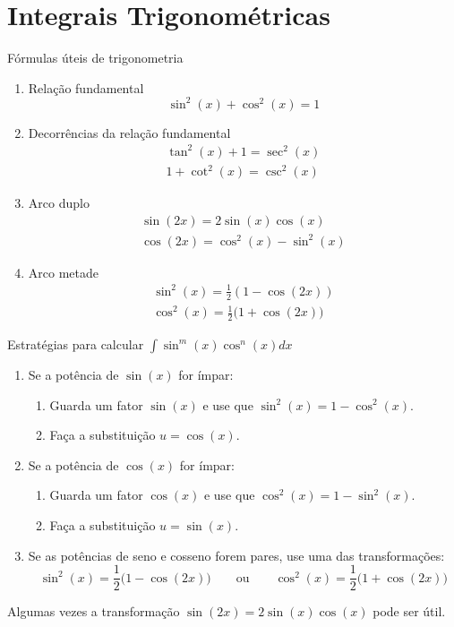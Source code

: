 \section{Integrais Trigonométricas}
\label{sec:Integais_Trigonometricas}

Fórmulas úteis de trigonometria
\begin{enumerate}
  \item
    Relação fundamental
    \[
      \sin^2(x)+ \cos^2(x)=1
    \]

  \item
    Decorrências da relação fundamental
    \begin{gather*}
      \tan^2(x)+ 1  = \sec^2(x) \\
      1 + \cot^2(x) = \csc^2(x)
    \end{gather*}

  \item
    Arco duplo
    \begin{gather*}
      \sin(2x) = 2\sin(x) \cos(x) \\
      \cos(2x) = \cos^2(x)-\sin^2(x)
    \end{gather*}
  \item
    Arco metade
    \begin{gather*}
      \sin^2(x)= \frac{1}{2}(1-\cos(2x)) \\
      \cos^2(x)= \frac{1}{2}\big(1+\cos(2x)\big)
    \end{gather*}
\end{enumerate}

Estratégias para calcular \(\int \sin^m(x) \cos^n(x)dx\)
\begin{enumerate}
  \item Se a potência de $\sin(x)$ for ímpar:
    \begin{enumerate}
      \item Guarda um fator $\sin(x)$ e use que $\sin^2(x)=1- \cos^2(x)$.
      \item Faça a substituição $u=\cos(x)$.
    \end{enumerate}

  \item Se a potência de $\cos(x)$ for ímpar:
    \begin{enumerate}
      \item Guarda um fator $\cos(x)$ e use que $\cos^2(x)=1- \sin^2(x)$.
      \item Faça a substituição $u=\sin(x)$.
    \end{enumerate}

  \item Se as potências de seno e cosseno forem pares, use uma das transformações:
    \[
      \sin^2(x)= \frac{1}{2}\big(1-\cos(2x)\big) \qquad\text{ou}\qquad
      \cos^2(x)= \frac{1}{2}\big(1+\cos(2x)\big)
    \]
\end{enumerate}
Algumas vezes a transformação $\sin(2x)=2\sin(x)\cos(x)$ pode ser útil.

